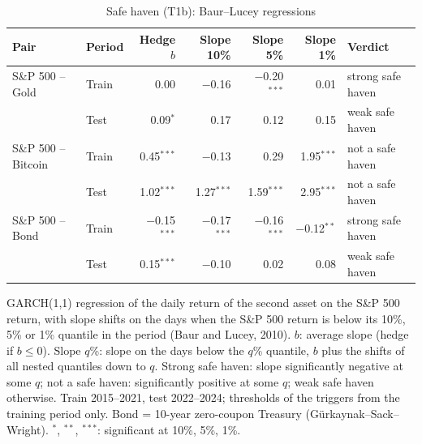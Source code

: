 \begin{table}[t]
\centering
\scriptsize
\setlength{\tabcolsep}{3.5pt}
\caption{Safe haven (T1b): Baur--Lucey regressions}
\label{tab:econ_t1}
\begin{tabular}{llrrrrl}
\toprule
Pair & Period & Hedge $b$ & Slope 10\% & Slope 5\% & Slope 1\% & Verdict \\
\midrule
S\&P 500 -- Gold & Train & 0.00 & $-$0.16 & $-$0.20$^{***}$ & 0.01 & strong safe haven \\
 & Test & 0.09$^{*}$ & 0.17 & 0.12 & 0.15 & weak safe haven \\
S\&P 500 -- Bitcoin & Train & 0.45$^{***}$ & $-$0.13 & 0.29 & 1.95$^{***}$ & not a safe haven \\
 & Test & 1.02$^{***}$ & 1.27$^{***}$ & 1.59$^{***}$ & 2.95$^{***}$ & not a safe haven \\
S\&P 500 -- Bond & Train & $-$0.15$^{***}$ & $-$0.17$^{***}$ & $-$0.16$^{***}$ & $-$0.12$^{**}$ & strong safe haven \\
 & Test & 0.15$^{***}$ & $-$0.10 & 0.02 & 0.08 & weak safe haven \\
\bottomrule
\end{tabular}
\par\smallskip
\parbox{\linewidth}{\footnotesize GARCH(1,1) regression of the daily return of the second asset on the S\&P 500 return, with slope shifts on the days when the S\&P 500 return is below its 10\%, 5\% or 1\% quantile in the period (Baur and Lucey, 2010). $b$: average slope (hedge if $b \le 0$). Slope $q$\%: slope on the days below the $q$\% quantile, $b$ plus the shifts of all nested quantiles down to $q$. Strong safe haven: slope significantly negative at some $q$; not a safe haven: significantly positive at some $q$; weak safe haven otherwise. Train 2015--2021, test 2022--2024; thresholds of the triggers from the training period only. Bond = 10-year zero-coupon Treasury (G\"urkaynak--Sack--Wright). $^{*}$, $^{**}$, $^{***}$: significant at 10\%, 5\%, 1\%.}
\end{table}

